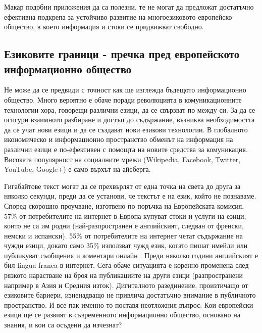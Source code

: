 \documentclass[]{../../metanetpaper}
\begin{document}
\begin{multicols}{2}
Макар подобни приложения да са полезни, те не могат да предложат достатъчно ефективна подкрепа за устойчиво развитие на многоезиковото европейско общество, в което информация и стоки се придвижват свободно.

\subsection{Езиковите граници - пречка пред европейското информационно общество}
  
Не може да се предвиди с точност как ще изглежда
бъдещото информационно общество. Много вероятно е обаче поради революцията в комуникационните технологии хора, говорещи различни езици, да се свързват по между си.
За да се осигури взаимното разбиране и достъп до съдържание, възниква необходимостта да се учат нови езици и да се създават нови езикови технологии. В глобалното икономическо и информационно пространство обменът на информация на различни езици е по-ефективен с помощта на новите средства за комуникация. Високата популярност на социалните мрежи  (Wikipedia, Facebook, Twitter, YouTube, Google+)  е само върхът на айсберга.


Гигабайтове текст могат да се прехвърлят от една точка на света до друга за няколко секунди, преди да се установи, че текстът е на език, който не познаваме. Според скорошно проучване, изготвено по поръчка на Европейската
 комисия, 57\% от потребителите на интернет в Европа
 купуват стоки и услуги на езици, които не са им родни
 (най-разпространен е английският, следван от
 френски, немски и испански). 55\% от потребителите на интернет четат съдържание на чужди езици, докато само 35\% използват чужд език, когато пишат имейли или публикуват съобщения и коментари онлайн \cite{EC1}. Преди няколко
 години английският е бил lingua franca в интернет. Сега обаче ситуацията е коренно променена след  рязкото нарастване  на броя на публикациите на други езици (разпространени например в Азия и Средния изток). Дигиталното разединение, произтичащо от езиковите бариери, 
 изненадващо не привлича достатъчно внимание в публичното
 пространство. И все пак именно то поставя неотложния
 въпрос: Кои европейски езици ще се развият в съвременното информационно общество, основано на знания, и кои са осъдени да изчезнат?


\end{multicols}
\end{document}
